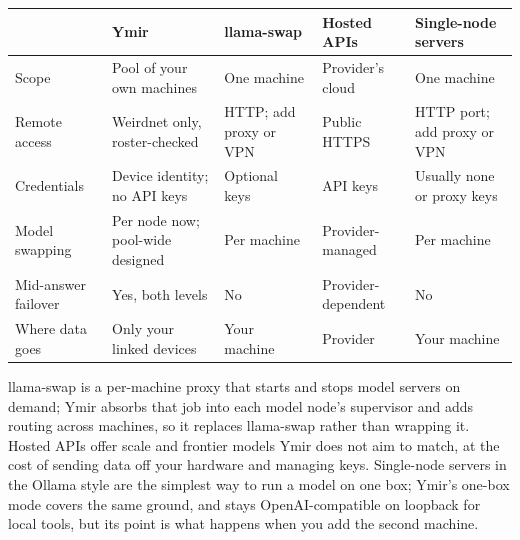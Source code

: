 {\small
\begin{xltabular}{\linewidth}{@{}L{2.4cm}YYYY@{}}
\toprule
 & Ymir & llama-swap & Hosted APIs & Single-node servers \\
\midrule
\endhead
Scope & Pool of your own machines & One machine & Provider's cloud & One machine \\
Remote access & Weirdnet only, roster-checked & HTTP; add proxy or VPN & Public HTTPS & HTTP port; add proxy or VPN \\
Credentials & Device identity; no API keys & Optional keys & API keys & Usually none or proxy keys \\
Model swapping & Per node now; pool-wide designed & Per machine & Provider-managed & Per machine \\
Mid-answer failover & Yes, both levels & No & Provider-dependent & No \\
Where data goes & Only your linked devices & Your machine & Provider & Your machine \\
\bottomrule
\end{xltabular}
}

llama-swap is a per-machine proxy that starts and stops model servers on demand; Ymir absorbs that
job into each model node's supervisor and adds routing across machines, so it replaces llama-swap
rather than wrapping it. Hosted APIs offer scale and frontier models Ymir does not aim to match,
at the cost of sending data off your hardware and managing keys. Single-node servers in the
Ollama style are the simplest way to run a model on one box; Ymir's one-box mode covers the same
ground, and stays OpenAI-compatible on loopback for local tools, but its point is what happens
when you add the second machine.
